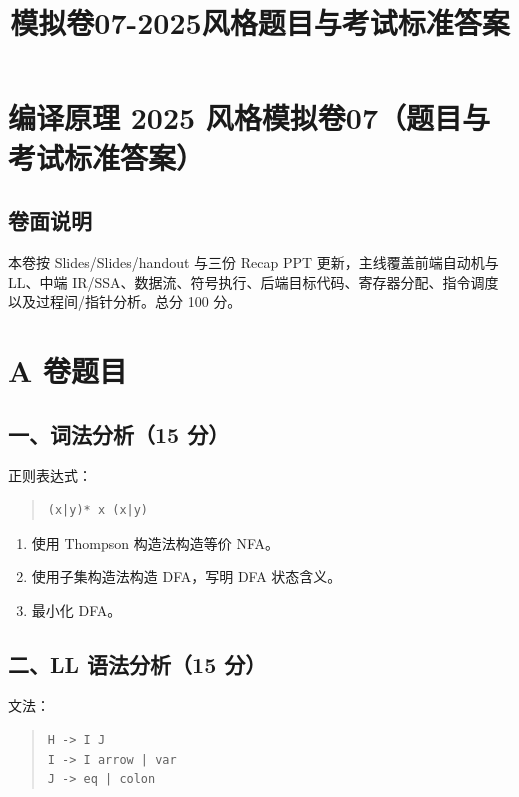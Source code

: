 \documentclass[UTF8,zihao=-4]{ctexart}
\title{模拟卷07-2025风格题目与考试标准答案}
\author{}
\date{}
\begin{document}
\maketitle
\setcounter{tocdepth}{1}
\tableofcontents
\newpage
\section{编译原理 2025 风格模拟卷07（题目与考试标准答案）}


\subsection{卷面说明}


本卷按 Slides/Slides/handout 与三份 Recap PPT 更新，主线覆盖前端自动机与 LL、中端 IR/SSA、数据流、符号执行、后端目标代码、寄存器分配、指令调度以及过程间/指针分析。总分 100 分。


\section{A 卷题目}


\subsection{一、词法分析（15 分）}


正则表达式：


\begin{quote}
\footnotesize
\begin{verbatim}
(x|y)* x (x|y)
\end{verbatim}
\end{quote}


\begin{enumerate}
\item 使用 Thompson 构造法构造等价 NFA。
\item 使用子集构造法构造 DFA，写明 DFA 状态含义。
\item 最小化 DFA。
\end{enumerate}


\subsection{二、LL 语法分析（15 分）}


文法：


\begin{quote}
\footnotesize
\begin{verbatim}
H -> I J
I -> I arrow | var
J -> eq | colon
\end{verbatim}
\end{quote}
\end{document}

